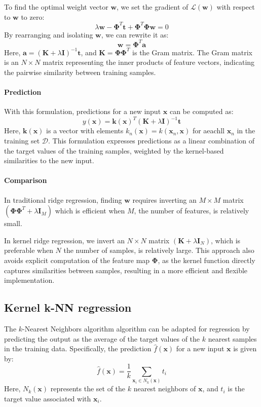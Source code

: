 To find the optimal weight vector $\mathbf{w}$, we set the gradient of $\mathcal{L}(\mathbf{w})$ with respect to $\mathbf{w}$ to zero:
\[\lambda\mathbf{w}-\boldsymbol{\Phi}^T\mathbf{t}+\boldsymbol{\Phi}^T\boldsymbol{\Phi}\mathbf{w}=0\]
By rearranging and isolating $\mathbf{w}$, we can rewrite it as:
\[\mathbf{w}=\boldsymbol{\Phi}^T\mathbf{a}\]
Here, $\mathbf{a} = {\left(\mathbf{K}+\lambda \mathbf{I}\right)}^{-1}\mathbf{t}$, and $\mathbf{K}=\boldsymbol{\Phi}\boldsymbol{\Phi}^T$ is the Gram matrix.
The Gram matrix is an $N\times N$ matrix representing the inner products of feature vectors, indicating the pairwise similarity between training samples.

\paragraph*{Prediction}
With this formulation, predictions for a new input $\mathbf{x}$ can be computed as:
\[y(\mathbf{x})=\mathbf{k}{(\mathbf{x})}^T{(\mathbf{K}+\lambda\mathbf{I})}^{-1}\mathbf{t}\]
Here, $\mathbf{k}(\mathbf{x})$ is a vector with elements $k_n(\mathbf{x})=k(\mathbf{x}_n,\mathbf{x})$ for aeachll $\mathbf{x}_n$ in the training set $\mathcal{D}$. 
This formulation expresses predictions as a linear combination of the target values of the training samples, weighted by the kernel-based similarities to the new input.

\paragraph*{Comparison}
In traditional ridge regression, finding $\mathbf{w}$ requires inverting an $M \times M$ matrix $(\boldsymbol{\Phi}\boldsymbol{\Phi}^T+\lambda\mathbf{I}_M)$ which is efficient when $M$, the number of features, is relatively small.

In kernel ridge regression, we invert an $N \times N$ matrix $(\mathbf{K}+\lambda\mathbf{I}_N)$, which is preferable when $N$ the number of samples, is relatively large.
This approach also avoids explicit computation of the feature map $\boldsymbol{\Phi}$, as the kernel function directly captures similarities between samples, resulting in a more efficient and flexible implementation.

\subsection{Kernel k-NN regression}
The $k$-Nearest Neighbors algorithm algorithm can be adapted for regression by predicting the output as the average of the target values of the $k$ nearest samples in the training data. 
Specifically, the prediction $\hat{f}(\mathbf{x})$ for a new input $\mathbf{x}$ is given by:
\[\hat{f}(\mathbf{x})=\dfrac{1}{k}\sum_{\mathbf{x}_i\in N_k(\mathbf{x})}t_i\]
Here, $N_k(\mathbf{x})$ represents the set of the $k$ nearest neighbors of $\mathbf{x}$, and $t_i$ is the target value associated with $\mathbf{x}_i$. 

